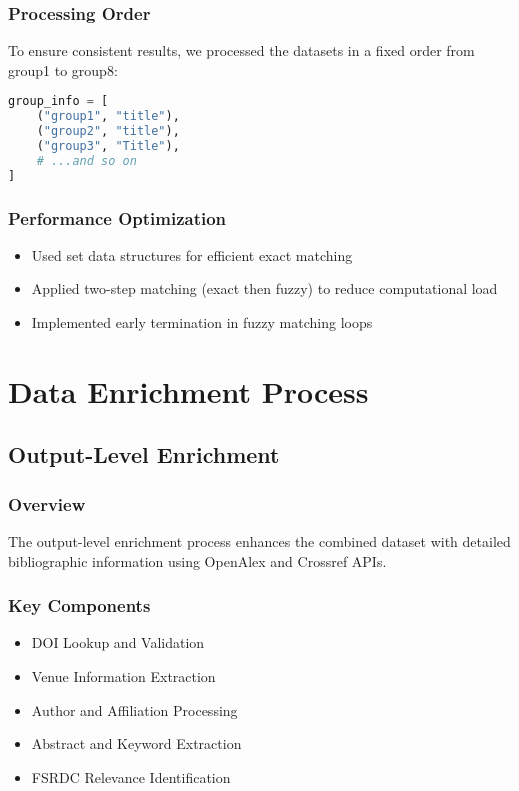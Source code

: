 \documentclass[12pt]{article}
\begin{document}
\subsubsection{Processing Order}
To ensure consistent results, we processed the datasets in a fixed order from group1 to group8:

\begin{lstlisting}[language=Python]
group_info = [
    ("group1", "title"),
    ("group2", "title"),
    ("group3", "Title"),
    # ...and so on
]
\end{lstlisting}

\subsubsection{Performance Optimization}
\begin{itemize}
    \item Used set data structures for efficient exact matching
    \item Applied two-step matching (exact then fuzzy) to reduce computational load
    \item Implemented early termination in fuzzy matching loops
\end{itemize}

\section{Data Enrichment Process}

\subsection{Output-Level Enrichment}

\subsubsection{Overview}
The output-level enrichment process enhances the combined dataset with detailed bibliographic information using OpenAlex and Crossref APIs.

\subsubsection{Key Components}
\begin{itemize}
    \item DOI Lookup and Validation
    \item Venue Information Extraction
    \item Author and Affiliation Processing
    \item Abstract and Keyword Extraction
    \item FSRDC Relevance Identification
\end{itemize}
\end{document}
